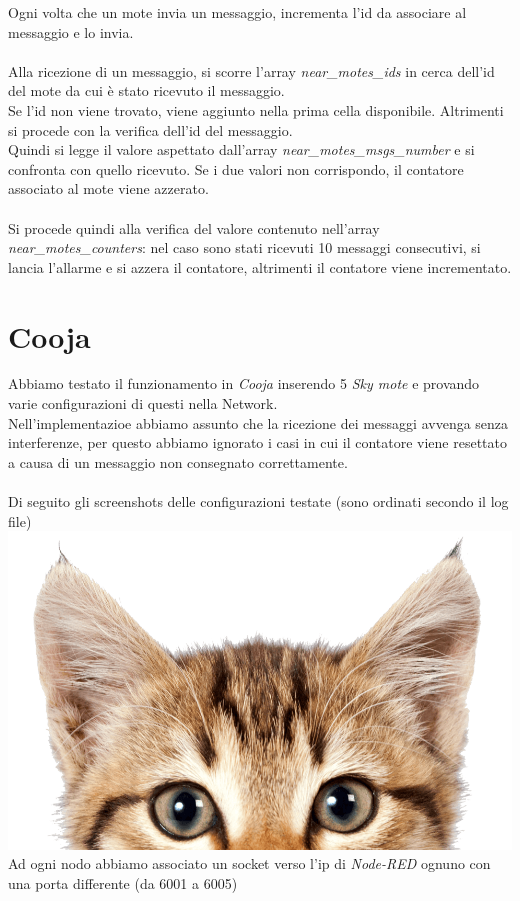 \documentclass{article}
\begin{document}
Ogni volta che un mote invia un messaggio, incrementa l'id da associare al messaggio e lo invia.\\\\
Alla ricezione di un messaggio, si scorre l'array \textit{near\_motes\_ids} in cerca dell'id del mote da cui è stato 
ricevuto il messaggio. \\
Se l'id non viene trovato, viene aggiunto nella prima cella disponibile.
Altrimenti si procede con la verifica dell'id del messaggio. \\
Quindi si legge il valore aspettato dall'array \textit{near\_motes\_msgs\_number} e si confronta con quello ricevuto. 
Se i due valori non corrispondo, il contatore associato al mote viene azzerato.\\\\
Si procede quindi alla verifica del valore contenuto nell'array \textit{near\_motes\_counters}: nel caso sono stati
ricevuti 10 messaggi consecutivi, si lancia l'allarme e si azzera il contatore, altrimenti il contatore viene incrementato.

\section{Cooja}
Abbiamo testato il funzionamento in \textit{Cooja} inserendo 5 \textit{Sky mote} e provando varie configurazioni di questi nella Network.\\
Nell'implementazioe abbiamo assunto che la ricezione dei messaggi avvenga senza interferenze, per questo abbiamo
ignorato i casi in cui il contatore viene resettato a causa di un messaggio non consegnato correttamente.
\\\\
Di seguito gli screenshots delle configurazioni testate (sono ordinati secondo il log file)
\\
\includegraphics[scale=0.1]{inserire_immagine_qui_e_in_cartella_res.png}
\\
Ad ogni nodo abbiamo associato un socket verso l'ip di \textit{Node-RED} ognuno con una porta differente (da 6001 a 6005)
\end{document}
